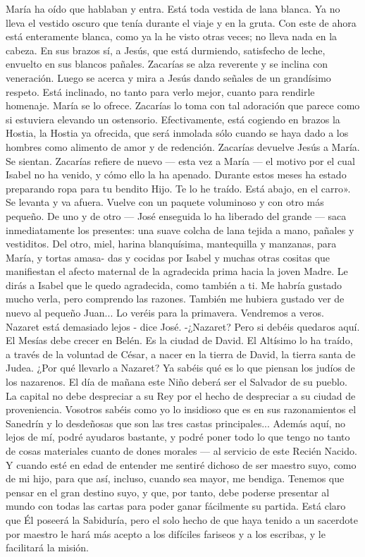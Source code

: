 \documentclass[12pt]{book} %
\begin{document}
María ha oído que hablaban y entra. Está toda vestida de lana blanca. Ya no lleva el vestido oscuro que tenía durante el 
viaje y en la gruta. Con este de ahora está enteramente blanca, como ya la he visto otras veces; no lleva nada en la cabeza. En sus brazos sí, a Jesús, que está durmiendo, satisfecho de leche, envuelto en sus blancos pañales. 
Zacarías se alza reverente y se inclina con veneración. Luego se acerca y mira a Jesús dando señales de un grandísimo 
respeto. Está inclinado, no tanto para verlo mejor, cuanto para rendirle homenaje. María se lo ofrece. Zacarías lo toma con tal adoración que parece como si estuviera elevando un ostensorio. Efectivamente, está cogiendo en brazos la Hostia, la Hostia ya ofrecida, que será inmolada sólo cuando se haya dado a los hombres como alimento de amor y de redención. Zacarías devuelve Jesús a María. 
Se sientan. Zacarías refiere de nuevo — esta vez a María — el motivo por el cual Isabel no ha venido, y cómo ello la ha apenado. 
Durante estos meses ha estado preparando ropa para tu bendito Hijo. Te lo he traído. Está abajo, en el carro». 
Se levanta y va afuera. Vuelve con un paquete voluminoso y con otro más pequeño. De uno y de otro — José enseguida lo ha liberado del grande — saca inmediatamente los presentes: una suave colcha de lana tejida a mano, pañales y vestiditos. Del otro, miel, harina blanquísima, mantequilla y manzanas, para María, y tortas amasa- das y cocidas por Isabel y muchas otras cositas que manifiestan el afecto maternal de la agradecida prima hacia la joven Madre. 
Le dirás a Isabel que le quedo agradecida, como también a ti. Me habría gustado mucho verla, pero comprendo las razones. También me hubiera gustado ver de nuevo al pequeño Juan... 
Lo veréis para la primavera. Vendremos a veros. 
Nazaret está demasiado lejos - dice José. 
-¿Nazaret? Pero si debéis quedaros aquí. El Mesías debe crecer en Belén. Es la ciudad de David. El Altísimo lo ha traído, 
a través de la voluntad de César, a nacer en la tierra de David, la tierra santa de Judea. ¿Por qué llevarlo a Nazaret? Ya sabéis qué es lo que piensan los judíos de los nazarenos. El día de mañana este Niño deberá ser el Salvador de su pueblo. La capital no debe despreciar a su Rey por el hecho de despreciar a su ciudad de proveniencia. Vosotros sabéis como yo lo insidioso que es en sus razonamientos el Sanedrín y lo desdeñosas que son las tres castas principales... Además aquí, no lejos de mí, podré ayudaros bastante, y podré poner todo lo que tengo no tanto de cosas materiales cuanto de dones morales — al servicio de este Recién Nacido. Y cuando esté en edad de entender me sentiré dichoso de ser maestro suyo, como de mi hijo, para que así, incluso, cuando sea mayor, me bendiga. Tenemos que pensar en el gran destino suyo, y que, por tanto, debe poderse presentar al mundo con todas las cartas para poder ganar fácilmente su partida. Está claro que Él poseerá la Sabiduría, pero el solo hecho de que haya tenido a un sacerdote por maestro le hará más acepto a los difíciles fariseos y a los escribas, y le facilitará la misión. 
\end{document}
